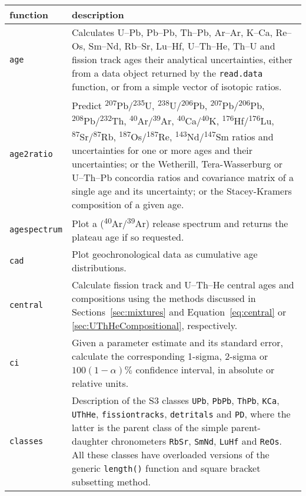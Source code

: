 \begin{refsection}
\begin{longtable}{@{}p{.2\linewidth}@{}p{.8\linewidth}@{}}
function & description \\ \hline

\texttt{age} & Calculates U--Pb, Pb--Pb, Th--Pb, Ar--Ar, K--Ca,
Re--Os, Sm--Nd, Rb--Sr, Lu--Hf, U--Th--He, Th--U and fission track
ages their analytical uncertainties, either from a data object
returned by the \texttt{read.data} function, or from a simple vector
of isotopic ratios. \\

\texttt{age2ratio} & Predict
\textsuperscript{207}Pb/\textsuperscript{235}U,
\textsuperscript{238}U/\textsuperscript{206}Pb,
\textsuperscript{207}Pb/\textsuperscript{206}Pb,
\textsuperscript{208}Pb/\textsuperscript{232}Th,
\textsuperscript{40}Ar/\textsuperscript{39}Ar,
\textsuperscript{40}Ca/\textsuperscript{40}K,
\textsuperscript{176}Hf/\textsuperscript{176}Lu,
\textsuperscript{87}Sr/\textsuperscript{87}Rb,
\textsuperscript{187}Os/\textsuperscript{187}Re,
\textsuperscript{143}Nd/\textsuperscript{147}Sm ratios and
uncertainties for one or more ages and their uncertainties; or the
Wetherill, Tera-Wasserburg or U--Th--Pb concordia ratios and
covariance matrix of a single age and its uncertainty; or the
Stacey-Kramers composition of a given age.\\

\texttt{agespectrum} & Plot a
(\textsuperscript{40}Ar/\textsuperscript{39}Ar) release spectrum and
returns the plateau age if so requested.\\

\texttt{cad} & Plot geochronological data as cumulative age
distributions.\\

\texttt{central} & Calculate fission track and U--Th--He central ages
and compositions using the methods discussed in
Sections~\ref{sec:mixtures} and Equation~\ref{eq:central} or
\ref{sec:UThHeCompositional}, respectively.\\

\texttt{ci} & Given a parameter estimate and its standard error,
calculate the corresponding 1-sigma, 2-sigma or $100 (1-\alpha)\%$
confidence interval, in absolute or relative units.\\

\texttt{classes} & Description of the S3 classes \texttt{UPb},
\texttt{PbPb}, \texttt{ThPb}, \texttt{KCa}, \texttt{UThHe},
\texttt{fissiontracks}, \texttt{detritals} and \texttt{PD}, where the
latter is the parent class of the simple parent-daughter chronometers
\texttt{RbSr}, \texttt{SmNd}, \texttt{LuHf} and \texttt{ReOs}. All
these classes have overloaded versions of the generic
\texttt{length()} function and square bracket subsetting method.\\


\end{longtable}
\end{refsection}
